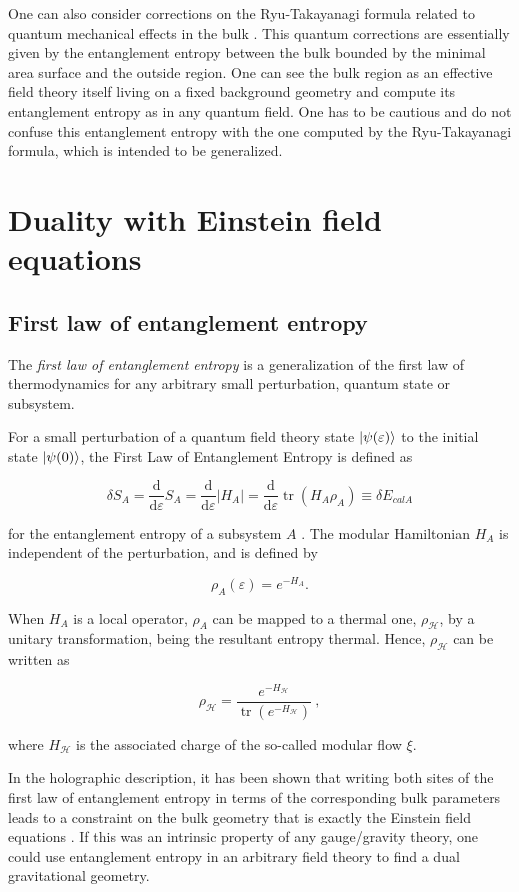 \documentclass[twocolumn]{revtex4}
\providecommand{\abs}[1]{\lvert#1\rvert}
\providecommand{\eq}[2]{
    \begin{equation}
        #2
    \label{eq:#1}
    \end{equation}
}
\DeclareMathOperator{\calH}{\mathcal{H}}
\DeclareMathOperator{\tr}{tr}
\begin{document}
One can also consider corrections on the Ryu-Takayanagi formula related to quantum mechanical effects in the bulk \cite{faulkner_quantum_2013}. This quantum corrections are essentially given by the entanglement entropy between the bulk bounded by the minimal area surface and the outside region. One can see the bulk region as an effective field theory itself living on a fixed background geometry and compute its entanglement entropy as in any quantum field. One has to be cautious and do not confuse this entanglement entropy with the one computed by the Ryu-Takayanagi formula, which is intended to be generalized.


\section{Duality with Einstein field equations} \label{s:EQ}


\subsection{First law of entanglement entropy} \label{ss:FLEE}

The \textit{first law of entanglement entropy} is a generalization of the first law of thermodynamics for any arbitrary small perturbation, quantum state or subsystem.

For a small perturbation of a quantum field theory state $\ket{\psi(\varepsilon)}$ to the initial state $\ket{\psi(0)}$, the First Law of Entanglement Entropy is defined as
\eq{FLEE}{
    \delta S_A = \frac{\mathrm{d}}{\mathrm{d} \varepsilon} S_A = \frac{\mathrm{d}}{\mathrm{d} \varepsilon} \abs{H_A} = \frac{\mathrm{d}}{\mathrm{d} \varepsilon} \tr (H_A \rho_A) \equiv \delta E_{calA}
}
for the entanglement entropy of a subsystem $A$ \cite{fareghbal_first_2019}. The modular Hamiltonian $H_A$ is independent of the perturbation, and is defined by
\eq{modularH}{
    \rho_A (\varepsilon) = e^{-H_A}.
}

When $H_A$ is a local operator, $\rho_A$ can be mapped to a thermal one, $\rho_{\calH}$, by a unitary transformation, being the resultant entropy thermal. Hence, $\rho_{\calH}$ can be written as
\eq{modularH2}{
    \rho_{\calH} = \frac{e^{-H_{\calH}}}{\tr (e^{-H_{\calH}})} \ ,
}
where $H_{\calH}$ is the associated charge of the so-called modular flow $\xi$.

In the holographic description, it has been shown that writing both sites of the first law of entanglement entropy in terms of the corresponding bulk parameters leads to a constraint on the bulk geometry that is exactly the Einstein field equations \cite{fareghbal_first_2019}. If this was an intrinsic property of any gauge/gravity theory, one could use entanglement entropy in an arbitrary field theory to find a dual gravitational geometry.
\end{document}
